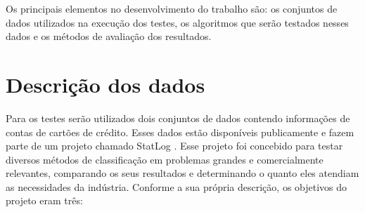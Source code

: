 Os principais elementos no desenvolvimento do trabalho são: os conjuntos de dados utilizados na execução dos testes, os algoritmos que serão testados nesses dados e os métodos de avaliação dos resultados.

\section{Descrição dos dados}

Para os testes serão utilizados dois conjuntos de dados contendo informações de contas de cartões de crédito. Esses dados estão disponíveis publicamente e fazem parte de um projeto chamado StatLog \cite{Michie1994}. Esse projeto foi concebido para testar diversos métodos de classificação em problemas grandes e comercialmente relevantes, comparando os seus resultados e determinando o quanto eles atendiam as necessidades da indústria. Conforme a sua própria descrição, os objetivos do projeto eram três:

